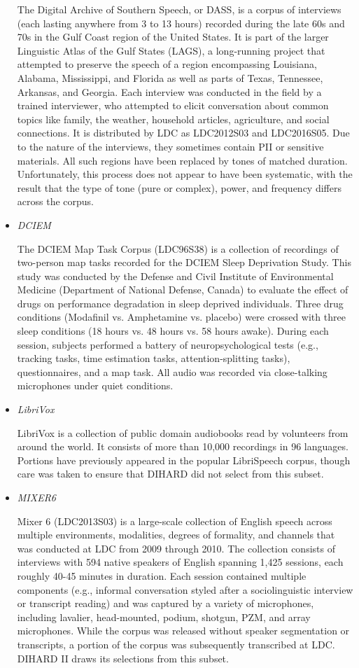 \begin{itemize}
The Digital Archive of Southern Speech, or DASS, is a corpus of interviews (each lasting anywhere from 3 to 13 hours) recorded during the late 60s and 70s in the Gulf Coast region of the United States. It is part of the larger Linguistic Atlas of the Gulf States (LAGS), a long-running project that attempted to preserve the speech of a region encompassing Louisiana, Alabama, Mississippi, and Florida as well as parts of Texas, Tennessee, Arkansas, and Georgia. Each interview was conducted in the field by a trained interviewer, who attempted to elicit conversation about common topics like family, the weather, household articles, agriculture, and social connections. It is distributed by LDC as LDC2012S03 and LDC2016S05.
Due to the nature of the interviews, they sometimes contain PII or sensitive materials. All such regions have been replaced by tones of matched duration. Unfortunately, this process does not appear to have been systematic, with the result that the type of tone (pure or complex), power, and frequency differs across the corpus.

\item \emph{DCIEM}

The DCIEM Map Task Corpus (LDC96S38) is a collection of recordings of two-person map tasks recorded for the DCIEM Sleep Deprivation Study. This study was conducted by the Defense and Civil Institute of Environmental Medicine (Department of National Defense, Canada) to evaluate the effect of drugs on performance degradation in sleep deprived individuals. Three drug conditions (Modafinil vs. Amphetamine vs. placebo) were crossed with three sleep conditions (18 hours vs. 48 hours vs. 58 hours awake). During each session, subjects performed a battery of neuropsychological tests (e.g., tracking tasks, time estimation tasks, attention-splitting tasks), questionnaires, and a map task. All audio was recorded via close-talking microphones under quiet conditions.

\item \emph{LibriVox}

LibriVox is a collection of public domain audiobooks read by volunteers from around the world. It consists of more than 10,000 recordings in 96 languages. Portions have previously appeared in the popular LibriSpeech corpus, though care was taken to ensure that DIHARD did not select from this subset.

\item \emph{MIXER6}

Mixer 6 (LDC2013S03) is a large-scale collection of English speech across multiple environments, modalities, degrees of formality, and channels that was conducted at LDC from 2009 through 2010. The collection consists of interviews with 594 native speakers of English spanning 1,425 sessions, each roughly 40-45 minutes in duration. Each session contained multiple components (e.g., informal conversation styled after a sociolinguistic interview or transcript reading) and was captured by a variety of microphones, including lavalier, head-mounted, podium, shotgun, PZM, and array microphones. While the corpus was released without speaker segmentation or transcripts, a portion of the corpus was subsequently transcribed at LDC. DIHARD II draws its selections from this subset.


\end{itemize}
